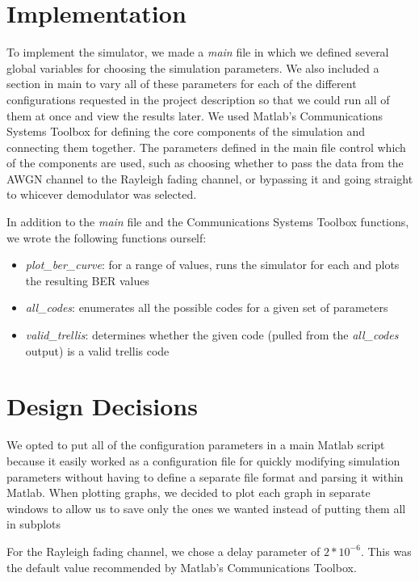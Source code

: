 \documentclass[a4paper,10pt]{article}
\begin{document}
\section{Implementation}

To implement the simulator, we made a \emph{main} file in which we defined several global variables for choosing the simulation parameters.
We also included a section in main to vary all of these parameters for each of the different configurations requested in the project description so that we could run all of them at once and view the results later.
We used Matlab's Communications Systems Toolbox for defining the core components of the simulation and connecting them together.
The parameters defined in the main file control which of the components are used, such as choosing whether to pass the data from the AWGN channel to the Rayleigh fading channel, or bypassing it and going straight to whicever demodulator was selected.

In addition to the \emph{main} file and the Communications Systems Toolbox functions, we wrote the following functions ourself:
\begin{itemize}
 \item \emph{plot\_ber\_curve}: for a range of \ebno values, runs the simulator for each and plots the resulting BER values
  \item \emph{all\_codes}: enumerates all the possible codes for a given set of parameters
  \item \emph{valid\_trellis}: determines whether the given code (pulled from the \emph{all\_codes} output) is a valid trellis code
\end{itemize}


\section{Design Decisions}

We opted to put all of the configuration parameters in a main Matlab script because it easily worked as a configuration file for quickly modifying simulation parameters without having to define a separate file format and parsing it within Matlab.
When plotting graphs, we decided to plot each graph in separate windows to allow us to save only the ones we wanted instead of putting them all in subplots

For the Rayleigh fading channel, we chose a delay parameter of $2*10^{-6}$. This was the default value recommended by Matlab's Communications Toolbox.
\end{document}
